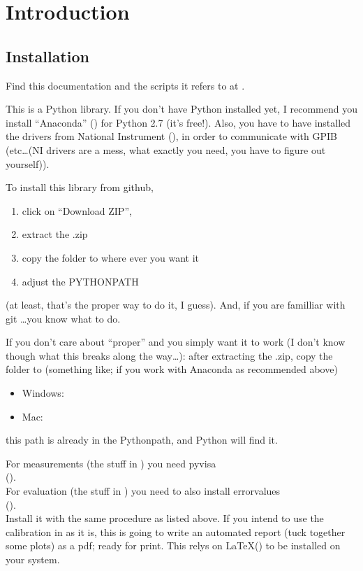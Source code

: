 \section{Introduction}

\subsection{Installation}

Find this documentation
and the scripts it refers to
at .

This is a Python library.
If you don't have Python installed yet,
I recommend you install ``Anaconda'' ()
for Python 2.7 (it's free!).
Also,
you have to have installed
the drivers from National Instrument (),
in order to communicate with GPIB
(etc\ldots (NI drivers are a mess, what exactly you need, you have to figure out yourself)).

To install this library
from github,
\begin{enumerate}
  \item click on ``Download ZIP'',
  \item extract the .zip
  \item copy the folder to where ever you want it
  \item adjust the PYTHONPATH
\end{enumerate}
(at least, that's the proper way to do it, I guess).  
And, if you are familliar with git \ldots you know what to do.

If you don't care about ``proper''
and you simply want it to work
(I don't know though what this breaks along the way\ldots):  
after extracting the .zip,
copy the folder to (something like; if you work with Anaconda as recommended above)
\begin{itemize}
  \item Windows: 
  \item Mac: 
\end{itemize}
this path is already in the Pythonpath,
and Python will find it.

For measurements (the stuff in ) you need pyvisa \\
().\\
For evaluation (the stuff in ) you need to also install errorvalues \\
(). \\
Install it with the same procedure as listed above.
If you intend to use the calibration in  as it is,
this is going to write an automated report (tuck together some plots) as a pdf;
ready for print.
This relys on \LaTeX () to be installed on your system.

